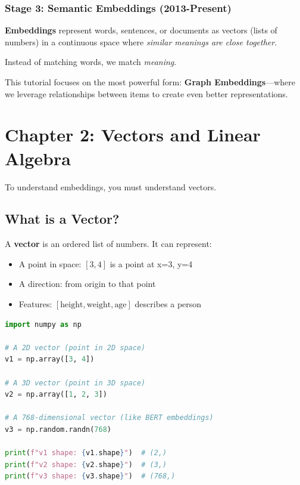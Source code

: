 \documentclass[12pt,a4paper]{article}
\begin{document}
\subsubsection{Stage 3: Semantic Embeddings (2013-Present)}

\begin{concept}
\textbf{Embeddings} represent words, sentences, or documents as vectors (lists of numbers) in a continuous space where \textit{similar meanings are close together}.

Instead of matching words, we match \textit{meaning}.
\end{concept}

This tutorial focuses on the most powerful form: \textbf{Graph Embeddings}---where we leverage relationships between items to create even better representations.

\section{Chapter 2: Vectors and Linear Algebra}

To understand embeddings, you must understand vectors.

\subsection{What is a Vector?}

\begin{concept}
A \textbf{vector} is an ordered list of numbers. It can represent:
\begin{itemize}
    \item A point in space: $[3, 4]$ is a point at x=3, y=4
    \item A direction: from origin to that point
    \item Features: $[\text{height}, \text{weight}, \text{age}]$ describes a person
\end{itemize}
\end{concept}

\begin{lstlisting}[language=Python,caption={Vectors in Python}]
import numpy as np

# A 2D vector (point in 2D space)
v1 = np.array([3, 4])

# A 3D vector (point in 3D space)
v2 = np.array([1, 2, 3])

# A 768-dimensional vector (like BERT embeddings)
v3 = np.random.randn(768)

print(f"v1 shape: {v1.shape}")  # (2,)
print(f"v2 shape: {v2.shape}")  # (3,)
print(f"v3 shape: {v3.shape}")  # (768,)
\end{lstlisting}
\end{document}
